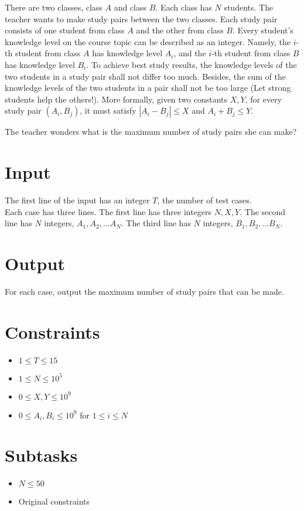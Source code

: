 
There are two classes, class $A$ and class $B$.
Each class has $N$ students.
The teacher wants to make study pairs between the two classes.
Each study pair consists of one student from class $A$ and the other from class $B$.
Every student's knowledge level on the course topic can be described as an integer.
Namely, the $i$-th student from class $A$ has knowledge level $A_i$, and the $i$-th student from class $B$ has knowledge level $B_i$.
To achieve best study results, the knowledge levels of the two students in a study pair shall not differ too much.
Besides, the sum of the knowledge levels of the two students in a pair shall not be too large (Let strong students help the others!).
More formally, given two constants $X, Y$, for every study pair $(A_i, B_j)$, it must satisfy $|A_i - B_j| \leq X$ and $A_i + B_j \leq Y$.


The teacher wonders what is the maximum number of study pairs she can make?


\section*{Input}

The first line of the input has an integer $T$, the number of test cases.\\
Each case has three lines.
The first line has three integers $N, X, Y$.
The second line has $N$ integers, $A_1, A_2, ... A_N$.
The third line has $N$ integers, $B_1, B_2, ... B_N$.

\section*{Output}

For each case, output the maximum number of study pairs that can be made.

\section*{Constraints}
\begin{itemize}
\item $1 \leq T\leq 15$
\item $1 \leq N \leq 10^5$
\item $0 \leq X, Y \leq 10^9$
\item $0 \leq A_i, B_i \leq 10^9$ for $1\leq i \leq N$
\end{itemize}

\section*{Subtasks}
\begin{itemize}
\item $N \leq 50$
\item Original constraints
\end{itemize}
